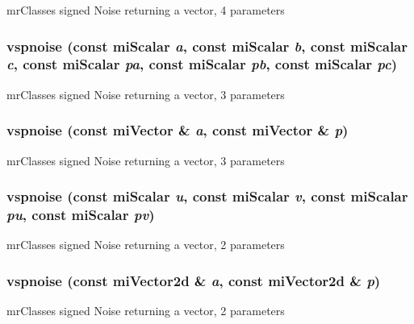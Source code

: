 mr\-Classes signed Noise returning a vector, 4 parameters 

\subsubsection{ vspnoise (const mi\-Scalar {\em a}, const mi\-Scalar {\em b}, const mi\-Scalar {\em c}, const mi\-Scalar {\em pa}, const mi\-Scalar {\em pb}, const mi\-Scalar {\em pc})\hspace{0.3cm}{\tt  [inline]}}\label{namespacersl_a95}


mr\-Classes signed Noise returning a vector, 3 parameters 

\subsubsection{ vspnoise (const mi\-Vector \& {\em a}, const mi\-Vector \& {\em p})\hspace{0.3cm}{\tt  [inline]}}\label{namespacersl_a94}


mr\-Classes signed Noise returning a vector, 3 parameters 

\subsubsection{ vspnoise (const mi\-Scalar {\em u}, const mi\-Scalar {\em v}, const mi\-Scalar {\em pu}, const mi\-Scalar {\em pv})\hspace{0.3cm}{\tt  [inline]}}\label{namespacersl_a93}


mr\-Classes signed Noise returning a vector, 2 parameters 

\subsubsection{ vspnoise (const mi\-Vector2d \& {\em a}, const mi\-Vector2d \& {\em p})\hspace{0.3cm}{\tt  [inline]}}\label{namespacersl_a92}


mr\-Classes signed Noise returning a vector, 2 parameters 

